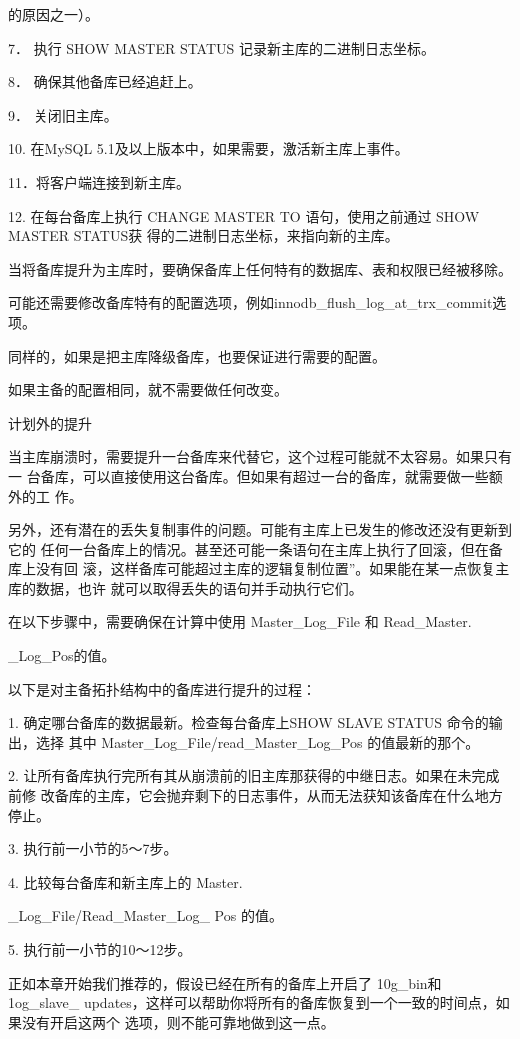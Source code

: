 的原因之一）。

7． 执行 SHOW MASTER STATUS 记录新主库的二进制日志坐标。

8． 确保其他备库已经追赶上。

9． 关闭旧主库。

10. 在MySQL 5.1及以上版本中，如果需要，激活新主库上事件。

11．将客户端连接到新主库。

12. 在每台备库上执行 CHANGE MASTER TO 语句，使用之前通过 SHOW MASTER STATUS获
得的二进制日志坐标，来指向新的主库。

当将备库提升为主库时，要确保备库上任何特有的数据库、表和权限已经被移除。

可能还需要修改备库特有的配置选项，例如innodb\_flush\_log\_at\_trx\_commit选项。

同样的，如果是把主库降级备库，也要保证进行需要的配置。

如果主备的配置相同，就不需要做任何改变。

计划外的提升

当主库崩溃时，需要提升一台备库来代替它，这个过程可能就不太容易。如果只有一
台备库，可以直接使用这台备库。但如果有超过一台的备库，就需要做一些额外的工
作。

另外，还有潜在的丢失复制事件的问题。可能有主库上已发生的修改还没有更新到它的
任何一台备库上的情况。甚至还可能一条语句在主库上执行了回滚，但在备库上没有回
滚，这样备库可能超过主库的逻辑复制位置”。如果能在某一点恢复主库的数据，也许
就可以取得丢失的语句并手动执行它们。

在以下步骤中，需要确保在计算中使用 Master\_Log\_File 和 Read\_Master.

\_Log\_Pos的值。

以下是对主备拓扑结构中的备库进行提升的过程：

1. 确定哪台备库的数据最新。检查每台备库上SHOW SLAVE STATUS 命令的输出，选择
其中 Master\_Log\_File/read\_Master\_Log\_Pos 的值最新的那个。

2. 让所有备库执行完所有其从崩溃前的旧主库那获得的中继日志。如果在未完成前修
改备库的主库，它会抛弃剩下的日志事件，从而无法获知该备库在什么地方停止。

3. 执行前一小节的5～7步。

4. 比较每台备库和新主库上的 Master.

\_Log\_File/Read\_Master\_Log\_ Pos 的值。

5. 执行前一小节的10～12步。

正如本章开始我们推荐的，假设已经在所有的备库上开启了 10g\_bin和1og\_slave\_
updates，这样可以帮助你将所有的备库恢复到一个一致的时间点，如果没有开启这两个
选项，则不能可靠地做到这一点。

